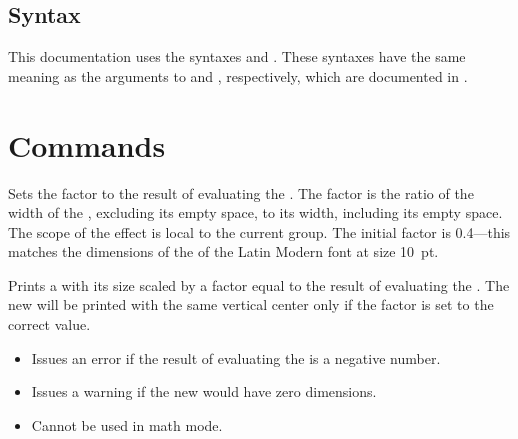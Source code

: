 \documentclass{beery}
\begin{document}
\subsection{Syntax}
\label{subsec:syntax}

This documentation uses the syntaxes  and .
These syntaxes have the same meaning as the arguments to  and , respectively, which are documented in .


\section{Commands}
\label{sec:commands}

\begin{function}{\settextbulletfactor}
  \begin{syntax}
     
  \end{syntax}
  Sets the  factor to the result of evaluating the .
  The  factor is the ratio of the width of the , excluding its empty space, to its width, including its empty space.
  The scope of the effect is local to the current group.
  The initial  factor is \num{0.4}---this matches the dimensions of the  of the Latin Modern font at size \qty{10}{pt}.
\end{function}

\begin{function}{\scaletextbullet}
  \begin{syntax}
     
  \end{syntax}
  Prints a  with its size scaled by a factor equal to the result of evaluating the .
  The new  will be printed with the same vertical center only if the  factor is set to the correct value.

  \begin{itemize}
    \item
    Issues an error if the result of evaluating the  is a negative number.
    \item
    Issues a warning if the new  would have zero dimensions.
    \item
    Cannot be used in math mode.
  \end{itemize}
\end{function}
\end{document}
